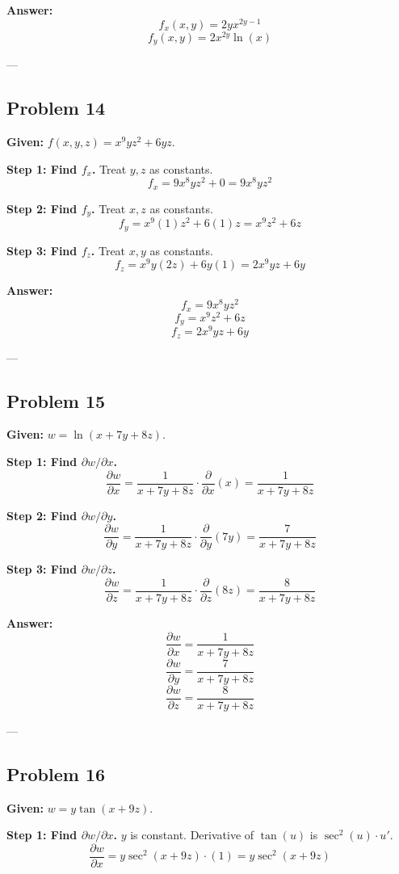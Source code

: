 \documentclass{article}
\begin{document}
\textbf{Answer:}
\[ f_x(x, y) = 2y x^{2y - 1} \]
\[ f_y(x, y) = 2 x^{2y} \ln(x) \]

---

\subsection*{Problem 14}
\textbf{Given:} $f(x, y, z) = x^9 y z^2 + 6yz$.

\textbf{Step 1: Find $f_x$.}
Treat $y, z$ as constants.
\[ f_x = 9x^8 y z^2 + 0 = 9x^8 y z^2 \]

\textbf{Step 2: Find $f_y$.}
Treat $x, z$ as constants.
\[ f_y = x^9 (1) z^2 + 6(1)z = x^9 z^2 + 6z \]

\textbf{Step 3: Find $f_z$.}
Treat $x, y$ as constants.
\[ f_z = x^9 y (2z) + 6y(1) = 2x^9 y z + 6y \]

\textbf{Answer:}
\[ f_x = 9x^8 y z^2 \]
\[ f_y = x^9 z^2 + 6z \]
\[ f_z = 2x^9 y z + 6y \]

---

\subsection*{Problem 15}
\textbf{Given:} $w = \ln(x + 7y + 8z)$.

\textbf{Step 1: Find $\partial w / \partial x$.}
\[ \frac{\partial w}{\partial x} = \frac{1}{x + 7y + 8z} \cdot \frac{\partial}{\partial x}(x) = \frac{1}{x + 7y + 8z} \]

\textbf{Step 2: Find $\partial w / \partial y$.}
\[ \frac{\partial w}{\partial y} = \frac{1}{x + 7y + 8z} \cdot \frac{\partial}{\partial y}(7y) = \frac{7}{x + 7y + 8z} \]

\textbf{Step 3: Find $\partial w / \partial z$.}
\[ \frac{\partial w}{\partial z} = \frac{1}{x + 7y + 8z} \cdot \frac{\partial}{\partial z}(8z) = \frac{8}{x + 7y + 8z} \]

\textbf{Answer:}
\[ \frac{\partial w}{\partial x} = \frac{1}{x + 7y + 8z} \]
\[ \frac{\partial w}{\partial y} = \frac{7}{x + 7y + 8z} \]
\[ \frac{\partial w}{\partial z} = \frac{8}{x + 7y + 8z} \]

---

\subsection*{Problem 16}
\textbf{Given:} $w = y \tan(x + 9z)$.

\textbf{Step 1: Find $\partial w / \partial x$.}
$y$ is constant. Derivative of $\tan(u)$ is $\sec^2(u) \cdot u'$.
\[ \frac{\partial w}{\partial x} = y \sec^2(x + 9z) \cdot (1) = y \sec^2(x + 9z) \]
\end{document}
